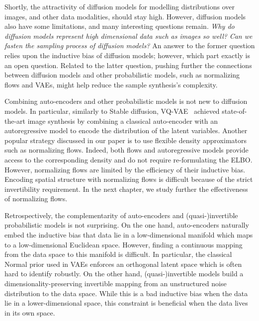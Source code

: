 Shortly, the attractivity of diffusion models for modelling distributions over images, and other data modalities, should stay high. However, diffusion models also have some limitations, and many interesting questions remain. \textit{Why do diffusion models represent high dimensional data such as images so well?} \textit{Can we fasten the sampling process of diffusion models?}
 An answer to the former question relies upon the inductive bias of diffusion models; however, which part exactly is an open question. Related to the latter question, pushing further the connections between diffusion models and other probabilistic models, such as normalizing flows and VAEs, might help reduce the sample synthesis's complexity.

 Combining auto-encoders and other probabilistic models is not new to diffusion models. In particular, similarly to Stable diffusion, VQ-VAE~\citep{razavi2019generating, razavi2019generating2} achieved state-of-the-art image synthesis by combining a classical auto-encoder with an autoregressive model to encode the distribution of the latent variables. Another popular strategy discussed in our paper is to use flexible density approximators such as normalizing flows. Indeed, both flows and autoregressive models provide access to the corresponding density and do not require re-formulating the ELBO. However, normalizing flows are limited by the efficiency of their inductive bias. Encoding spatial structure with normalizing flows is difficult because of the strict invertibility requirement. In the next chapter, we study further the effectiveness of normalizing flows.

 Retrospectively, the complementarity of auto-encoders and (quasi-)invertible probabilistic models is not surprising. On the one hand, auto-encoders naturally embed the inductive bias that data lie in a low-dimensional manifold which maps to a low-dimensional Euclidean space. However, finding a continuous mapping from the data space to this manifold is difficult. In particular, the classical Normal prior used in VAEs enforces an orthogonal latent space which is often hard to identify robustly. On the other hand, (quasi-)invertible models build a dimensionality-preserving invertible mapping from an unstructured noise distribution to the data space. While this is a bad inductive bias when the data lie in a lower-dimensional space, this constraint is beneficial when the data lives in its own space.


